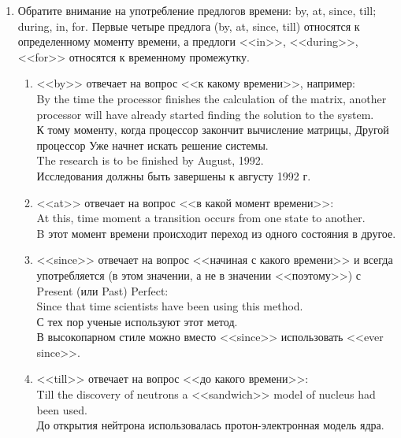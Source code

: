 \documentclass[a5paper, 10pt, twoside, numbers=enddot]{scrartcl}
\begin{document}
\begin{enumerate}
  \item Обратите внимание на употребление предлогов времени: by, at, since, till; during, in, for.
    Первые четыре предлога (by, at, since, till) относятся к определенному моменту времени, а
    предлоги <<in>>, <<during>>, <<for>> относятся к временному промежутку.
    \begin{enumerate}
      \item <<by>> отвечает на вопрос <<к какому времени>>, например:\\ [4pt]
        \textsf{
          By the time the processor finishes the calculation of the matrix, another processor will
          have already started finding the solution to the system.\\
          К тому моменту, когда процессор закончит вычисление матрицы, Другой процессор Уже начнет
          искать решение системы.\\ [4pt]
          The research is to be finished by August, 1992.\\
          Исследования должны быть завершены к августу 1992 г.
        }

      \item <<at>> отвечает на вопрос <<в какой момент времени>>:\\ [4pt]
        \textsf{
          At this, time moment a transition occurs from one state to another.\\
          B этот момент времени происходит переход из одного состояния в другое.
        }

      \item <<since>> отвечает на вопрос <<начиная с какого времени>> и всегда употребляется (в этом
        значении, а не в значении <<поэтому>>) с Present (или Past) Perfect:\\ [4pt]
        \textsf{
          Since that time scientists have been using this method.\\
          С тех пор ученые используют этот метод.\\ [4pt]
        }
        В высокопарном стиле можно вместо <<since>> использовать <<ever since>>.

      \item <<till>> отвечает на вопрос <<до какого времени>>:\\ [4pt]
        \textsf{
          Till the discovery of neutrons a <<sandwich>> model of nucleus had been used.\\
          До открытия нейтрона использовалась протон-электронная модель ядра.
        }


\end{enumerate}
\end{enumerate}
\end{document}
